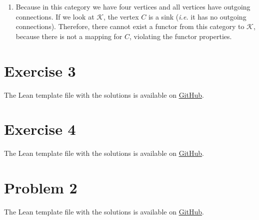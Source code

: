 \documentclass[11pt]{article}
\begin{document}
\begin{enumerate}[label=(\alph*)]
    \item Because in this category we have four vertices and all vertices have outgoing connections. If we look at $\mathcal{K}$, the vertex $C$ is a sink (\emph{i.e.} it has no outgoing connections). Therefore, there cannot exist a functor from this category to $\mathcal{K}$, because there is not a mapping for $C$, violating the functor properties.
\end{enumerate}


\section*{Exercise 3}
The Lean template file with the solutions is available on \href{https://github.com/lucastassis/BU-CS511/blob/main/HW13/code/HW13.lean}{GitHub}.

\section*{Exercise 4}
The Lean template file with the solutions is available on \href{https://github.com/lucastassis/BU-CS511/blob/main/HW13/code/HW13.lean}{GitHub}.

\section*{Problem 2}
The Lean template file with the solutions is available on \href{https://github.com/lucastassis/BU-CS511/blob/main/HW13/code/HW13.lean}{GitHub}.
\end{document}
